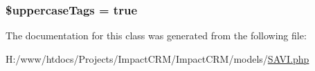 \label{classSavi__Parser_a0a6ff866cad56154d31e649d69ac8c0f}
\hypertarget{classSavi__Parser_ab025198049ed7f6ff96c43aba8c4ad20}{
\subsubsection[{\$uppercaseTags}]{\setlength{\rightskip}{0pt plus 5cm}\$uppercaseTags = true}}
\label{classSavi__Parser_ab025198049ed7f6ff96c43aba8c4ad20}


The documentation for this class was generated from the following file:\begin{DoxyCompactItemize}
\item 
H:/www/htdocs/Projects/ImpactCRM/ImpactCRM/models/\hyperlink{SAVI_8php}{SAVI.php}\end{DoxyCompactItemize}
